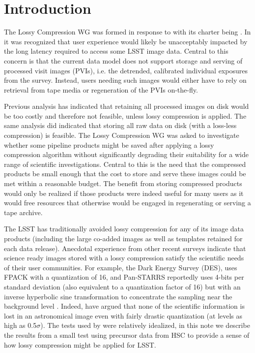 
\section{Introduction}

The Lossy Compression WG was formed in response to  with its charter
being .  In  it was recognized that user 
experience would likely be unacceptably impacted by the long latency required to 
access some LSST image data.  Central to this concern is that the current data model 
does not support storage and serving of processed visit images (PVIs), i.e. the 
detrended, calibrated individual exposures from the survey.  Instead, users needing
such images would either have to rely on retrieval from tape media or regeneration
of the PVIs on-the-fly.

Previous analysis has indicated that retaining all processed images on disk would 
be too costly and therefore not feasible, unless lossy compression is applied. 
The same analysis did indicated that storing all raw data on disk (with a loss-less 
compression) is feasible.  The Lossy Compression WG was asked to investigate whether 
some pipeline products might be saved after applying a lossy compression algorithm 
without significantly degrading their suitability for a wide range of scientific 
investigations.  Central to this is the need that the compressed products be small 
enough that the cost to store and serve these images could be met within a reasonable 
budget.  The benefit from storing compressed products would only be realized if those 
products were indeed useful for many users as it would free resources that otherwise
would be engaged in regenerating or serving a tape archive.

The LSST has traditionally avoided lossy compression for any of its image data products 
(including the large co-added images as well as templates retained for each data release). 
Anecdotal experience from other recent surveys indicate that science ready images stored
with a lossy compression satisfy the scientific needs of their user communities.  For example, 
the Dark Energy Survey (DES), uses FPACK \citep{PSW2009} with a quantization of 16, 
and Pan-STARRS reportedly uses 4-bits per standard deviation (also equivalent to a 
quantization factor of 16) but with an inverse hyperbolic sine transformation to concentrate 
the sampling near the background level \citep{Wetal2016}.  Indeed, \citet{PWH2010} have 
argued that none of the scientific information is lost in an astronomical image even with 
fairly drastic quantization (at levels as high as 0.5$\sigma$).  The tests used by \citet{PWH2010} 
were relatively idealized, in this note we describe the results from a small test using 
precursor data from HSC to provide a sense of how lossy compression might be applied for LSST.



